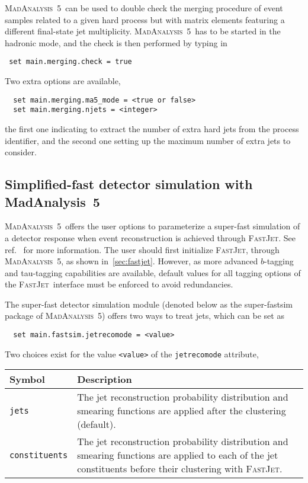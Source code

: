 \documentclass[a4paper]{article}
\newcommand{\MA}{\textsc{MadAnalysis}~5}
\newcommand{\MAnorm}{{MadAnalysis}~5}
\newcommand{\FJ}{\textsc{FastJet}}
\begin{document}
\noindent \MA\ can be used to double check the merging procedure of event samples related
to a given hard process but with matrix elements featuring a different
final-state jet multiplicity. \MA\ has to be started in the hadronic mode, and
the check is then performed by typing in
{\color{ao}\begin{verbatim}
 set main.merging.check = true
\end{verbatim}}
\noindent Two extra options are available,
{\color{ao}\begin{verbatim}
  set main.merging.ma5_mode = <true or false>
  set main.merging.njets = <integer>
\end{verbatim}}
\noindent the first one indicating to extract the number of extra hard jets from the
process identifier, and the second one setting up the maximum number of extra
jets to consider.

\vspace{2cm}
\begin{shaded}
	\section{\Large Simplified-fast detector simulation with \MAnorm}
\end{shaded}
\MA\ offers the user options to parameterize a super-fast simulation of a
detector response when event reconstruction is achieved through \FJ. See ref.~\cite{Araz:2020lnp} for more information. The user
should first initialize \FJ, through \MA, as shown in~\autoref{sec:fastjet}.
However, as more advanced $b$-tagging and tau-tagging capabilities are
available, default values for all tagging options of the \FJ\ interface must be
enforced to avoid redundancies.

The super-fast detector simulation module (denoted below as the super-fastsim
package of \MA) offers two ways to treat jets, which can be set as
{\color{ao} \begin{verbatim}
  set main.fastsim.jetrecomode = <value>
\end{verbatim}}
\noindent Two choices exist for the value \verb+<value>+ of the
{\tt jetrecomode} attribute,
\renewcommand{\arraystretch}{1.2}%
\begin{center}
  \begin{tabular}{l p{8.4cm}}
    \hline
    Symbol& Description\\
    \hline
    \color{ao} \verb?jets? &
      The jet reconstruction probability distribution and smearing functions are
      applied after the clustering (default).\\
    \color{ao} \verb?constituents?   &
      The jet reconstruction probability distribution and smearing functions are
      applied to each of the jet constituents before their clustering with \FJ.\\
    \hline
  \end{tabular}
\end{center}
\end{document}
